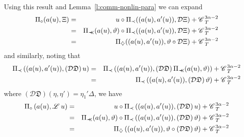 \documentclass[11pt,reqno]{amsart}
\newcommand{\precprec}{\prec\!\!\!\prec}
\newcommand{\CC}{\mathscr{C} \hspace{.1em}}
\newcommand{\LL}{\mathscr{L} \hspace{.2em}}
\newcommand{\DF}{\mathfrak{D}}
\begin{document}
Using this result and Lemma~\ref{l:comm-nonlin-para} we can expand
\begin{eqnarray*}
  \Pi_{\circ} (a (u), \Xi) & = & u \circ \Pi_{\prec} ((a (u), a' (u)),
  \mathcal{D} \Xi) + \CC_T^{3 \alpha - 2}\\
  & = & \Pi_{\precprec} (a (u), \vartheta) \circ \Pi_{\prec} ((a (u), a'
  (u)), \mathcal{D} \Xi) + \CC_T^{3 \alpha - 2}\\
  & = & \Pi_{\diamondsuit} ((a (u), a' (u)), \vartheta \circ \mathcal{D} \Xi)
  + \CC_T^{3 \alpha - 2}
\end{eqnarray*}
and similarly, noting that
\begin{eqnarray*}
  \Pi_{\prec} \left( (a (u), a' (u)), \left( \mathcal{D} \DF \right) u \right)
  & = & \Pi_{\prec} \left( (a (u), a' (u)), \left( \mathcal{D} \DF \right)
  \Pi_{\precprec} (a (u), \vartheta) \right) + \CC_T^{3 \alpha - 2}\\
  & = & \Pi_{\prec} \left( (a (u), a' (u)), \left( \mathcal{D} \DF \right)
  \vartheta \right) + \CC_T^{3 \alpha - 2}
\end{eqnarray*}
where $\left( \mathcal{D} \DF \right) (\eta, \eta') = \eta_1' \Delta$, we have
\begin{eqnarray*}
  \Pi_{\circ} \left( a (u), \LL u \right) & = & u \circ \Pi_{\prec} \left( (a
  (u), a' (u)), \left( \mathcal{D} \DF \right) u \right) + \CC_T^{3 \alpha -
  2}\\
  & = & \Pi_{\precprec} (a (u), \vartheta) \circ \Pi_{\prec} \left( (a (u),
  a' (u)), \left( \mathcal{D} \DF \right) \vartheta \right) + \CC_T^{3 \alpha
  - 2}\\
  & = & \Pi_{\diamondsuit} \left( (a (u), a' (u)), \vartheta \circ \left(
  \mathcal{D} \DF \right) \vartheta \right) + \CC_T^{3 \alpha - 2}
\end{eqnarray*}
\end{document}
